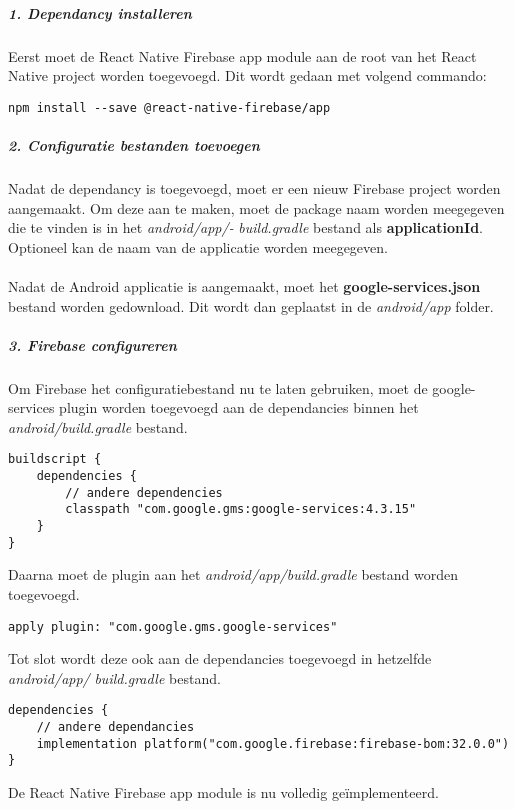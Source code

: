 \subparagraph{1. Dependancy installeren}
Eerst moet de React Native Firebase app module aan de root van het React Native project worden toegevoegd. 
Dit wordt gedaan met volgend commando:
\begin{verbatim}
npm install --save @react-native-firebase/app
\end{verbatim}

\subparagraph{2. Configuratie bestanden toevoegen}
Nadat de dependancy is toegevoegd, moet er een nieuw Firebase project worden aangemaakt. 
Om deze aan te maken, moet de package naam worden meegegeven die te vinden is in het 
\textit{android/app/-} \textit{build.gradle} bestand als 
\textbf{applicationId}. Optioneel kan de naam van de applicatie worden meegegeven.
\\\\
Nadat de Android applicatie is aangemaakt, moet het \textbf{google-services.json} bestand worden gedownload. 
Dit wordt dan geplaatst in de \textit{android/app} folder.

\subparagraph{3. Firebase configureren}
Om Firebase het configuratiebestand nu te laten gebruiken, moet de google-services plugin worden toegevoegd aan 
de dependancies binnen het \textit{android/build.gradle} bestand. 
\begin{verbatim}
buildscript {
    dependencies {
        // andere dependencies
        classpath "com.google.gms:google-services:4.3.15"
    }
}
\end{verbatim}
Daarna moet de plugin aan het \textit{android/app/build.gradle} bestand worden toegevoegd.
\begin{verbatim}
apply plugin: "com.google.gms.google-services"
\end{verbatim}
Tot slot wordt deze ook aan de dependancies toegevoegd in hetzelfde \textit{android/app/} \textit{build.gradle} bestand.
\begin{verbatim}
dependencies {
    // andere dependancies
    implementation platform("com.google.firebase:firebase-bom:32.0.0")
}
\end{verbatim}
De React Native Firebase app module is nu volledig geïmplementeerd.